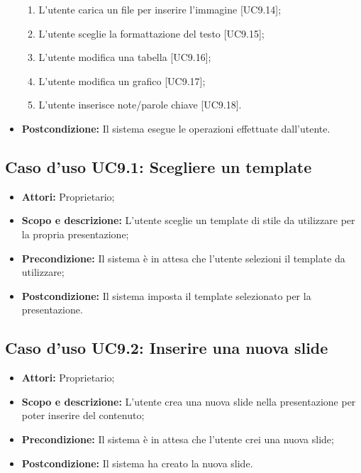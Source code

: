 \begin{itemize}
\begin{enumerate}
		\item L'utente carica un file per inserire l'immagine [UC9.14];
		\item L'utente sceglie la formattazione del testo [UC9.15];
		\item L'utente modifica una tabella [UC9.16];
		\item L'utente modifica un grafico [UC9.17];
		
		\item L'utente inserisce note/parole chiave [UC9.18].
	\end{enumerate}
	\item \textbf{Postcondizione:} Il sistema esegue le operazioni effettuate dall'utente.
\end{itemize}


\subsection{Caso d'uso UC9.1: Scegliere un \gls{template}}
\begin{itemize}
	\item \textbf{Attori:} Proprietario;
	\item \textbf{Scopo e descrizione:} L'utente sceglie un \gls{template} di stile da utilizzare per la propria presentazione;
	\item \textbf{Precondizione:} Il sistema è in attesa che l'utente selezioni il \gls{template} da utilizzare;
	\item \textbf{Postcondizione:} Il sistema imposta il \gls{template} selezionato per la presentazione.
\end{itemize}


\subsection{Caso d'uso UC9.2: Inserire una nuova \gls{slide}}
\begin{itemize}
	\item \textbf{Attori:} Proprietario;
	\item \textbf{Scopo e descrizione:} L'utente crea una nuova \gls{slide} nella presentazione per poter inserire del contenuto;
	\item \textbf{Precondizione:} Il sistema è in attesa che l'utente crei una nuova \gls{slide};
	\item \textbf{Postcondizione:} Il sistema ha creato la nuova \gls{slide}.
\end{itemize}


